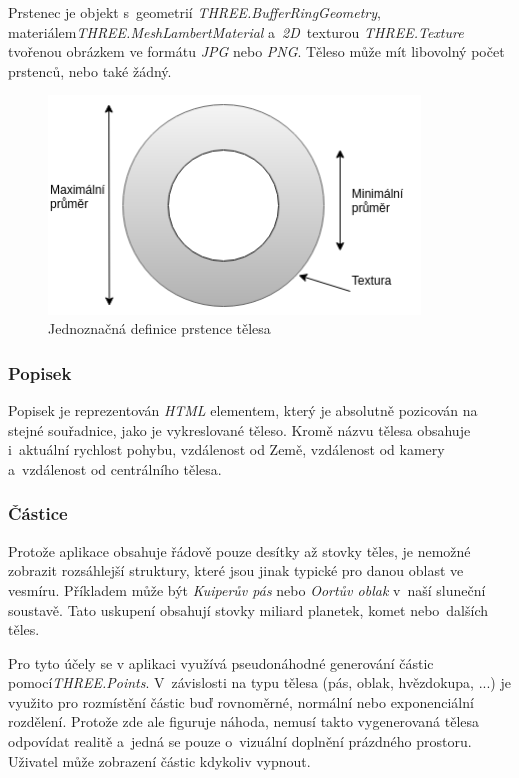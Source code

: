 \documentclass[a4paper,12pt]{article}
\begin{document}
Prstenec je objekt s~geometrií \textit{THREE.BufferRingGeometry}, materiálem\newline \textit{THREE.MeshLambertMaterial} a~\textit{2D}~texturou \textit{THREE.Texture} tvořenou obrázkem ve formátu \textit{JPG} nebo \textit{PNG}. Těleso může mít libovolný počet prstenců, nebo také žádný.

\begin{figure}[H]
\begin{center}
\includegraphics[width=280pt]{Images/RingData.png}
\caption[Jednoznačná definice prstence tělesa]{Jednoznačná definice prstence tělesa \footnotemark[1]}
\end{center}
\end{figure}


\subsubsection{Popisek}

Popisek je reprezentován \textit{HTML} elementem, který je absolutně pozicován na stejné souřadnice, jako je vykreslované těleso. Kromě názvu tělesa obsahuje i~aktuální rychlost pohybu, vzdálenost od Země, vzdálenost od kamery a~vzdálenost od centrálního tělesa.

\subsubsection{Částice}
Protože aplikace obsahuje řádově pouze desítky až stovky těles, je nemožné zobrazit rozsáhlejší struktury, které jsou jinak typické pro danou oblast ve vesmíru. Příkladem může být \textit{Kuiperův pás} nebo \textit{Oortův oblak} v~naší sluneční soustavě. Tato uskupení obsahují stovky miliard planetek, komet nebo~dalších těles. \cite{kleczek}

Pro tyto účely se v aplikaci využívá pseudonáhodné generování částic pomocí\break\textit{THREE.Points}. V~závislosti na typu tělesa (pás, oblak, hvězdokupa, ...) je využito pro rozmístění částic buď rovnoměrné, normální nebo exponenciální rozdělení.  Protože zde ale figuruje náhoda, nemusí takto vygenerovaná tělesa odpovídat realitě a~jedná se pouze o~vizuální doplnění prázdného prostoru. Uživatel může zobrazení částic kdykoliv vypnout.
\end{document}
